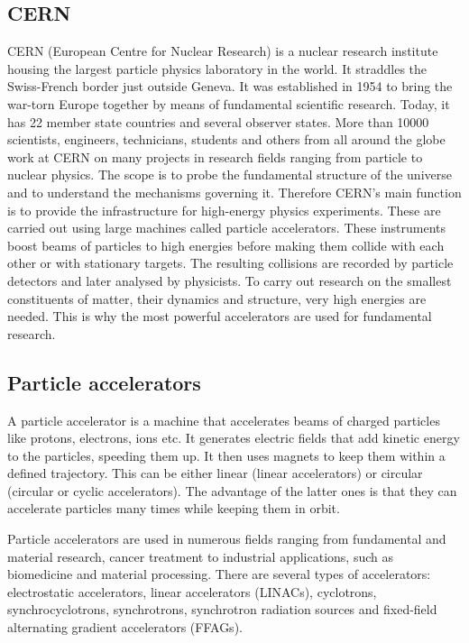 \documentclass[twoside,12pt]{packages/mytustyle}  %
\begin{document}
\subsection{CERN}
CERN (European Centre for Nuclear Research) is a nuclear research institute housing the largest particle physics laboratory in the world. It straddles the Swiss-French border just outside Geneva. It was established in 1954 to bring the war-torn Europe together by means of fundamental scientific research. Today, it has 22 member state countries and several observer states. More than 10000 scientists, engineers, technicians, students and others from all around the globe work at CERN on many projects in research fields ranging from particle to nuclear physics. The scope is to probe the fundamental structure of the universe and to understand the mechanisms governing it. Therefore CERN's main function is to provide the infrastructure for high-energy physics experiments. These are carried out using large machines called particle accelerators. These instruments boost beams of particles to high energies before making them collide with each other or with stationary targets. The resulting collisions are recorded by particle detectors and later analysed by physicists. To carry out research on the smallest constituents of matter, their dynamics and structure, very high energies are needed. This is why the most powerful accelerators are used for fundamental research. 

\subsection{Particle accelerators}
A particle accelerator is a machine that accelerates beams of charged particles like protons, electrons, ions etc. It generates electric fields that add kinetic energy to the particles, speeding them up. It then uses magnets to keep them within a defined trajectory. This can be either linear (linear accelerators) or circular (circular or cyclic accelerators). The advantage of the latter ones is that they can accelerate particles many times while keeping them in orbit.

Particle accelerators are used in numerous fields ranging from fundamental and material research, cancer treatment to industrial applications, such as biomedicine and material processing. There are several types of accelerators: electrostatic accelerators, linear accelerators (LINACs), cyclotrons, synchrocyclotrons, synchrotrons, synchrotron radiation sources and fixed-field alternating gradient accelerators (FFAGs).
\end{document}
